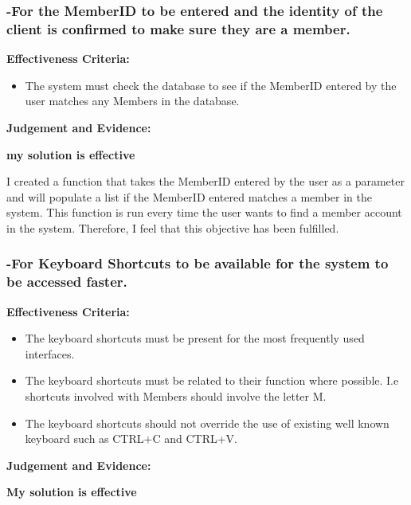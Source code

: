 \pagebreak
\subsubsection{-For the MemberID to be entered and the identity of the client is confirmed to make sure they are a member.}

\textbf{Effectiveness Criteria:}\newline
\begin{itemize}
	\item{The system must check the database to see if the MemberID entered by the user matches any Members in the database.}
\end{itemize}

\textbf{Judgement and Evidence:} \newline

\textbf{\large{my solution is effective}}

I created a function that takes the MemberID entered by the user as a parameter and will populate a list if the MemberID entered matches a member in the system. This function is run every time the user wants to find a member account in the system. Therefore, I feel that this objective has been fulfilled.




\pagebreak
\subsubsection{-For Keyboard Shortcuts to be available for the system to be accessed faster.}

\textbf{Effectiveness Criteria:}\newline
\begin{itemize}
	\item{The keyboard shortcuts must be present for the most frequently used interfaces.}
	\item{The keyboard shortcuts must be related to their function where possible. I.e shortcuts involved with Members should involve the letter M.}
	\item{The keyboard shortcuts should not override the use of existing well known keyboard such as CTRL+C and CTRL+V.}
\end{itemize}

\textbf{Judgement and Evidence:} \newline

\textbf{\large{My solution is effective}}

